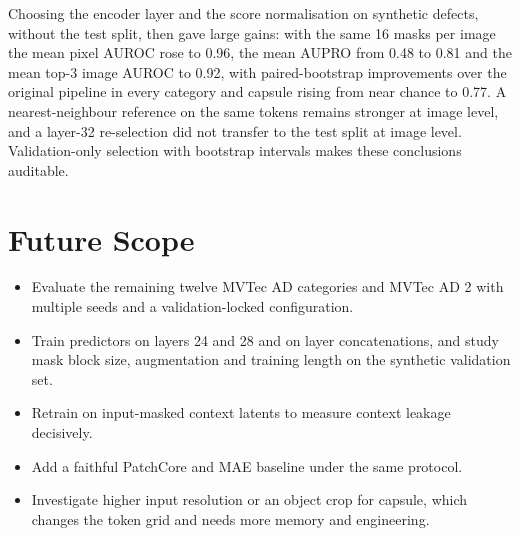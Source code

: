 \documentclass[12pt,a4paper,oneside]{report}
\begin{document}
Choosing the encoder layer and the score normalisation on synthetic defects,
without the test split, then gave large gains: with the same 16 masks per
image the mean pixel AUROC rose to 0.96, the mean AUPRO from 0.48 to 0.81
and the mean top-3 image AUROC to 0.92, with paired-bootstrap improvements
over the original pipeline in every category and capsule rising from near
chance to 0.77. A nearest-neighbour reference on the same tokens remains
stronger at image level, and a layer-32 re-selection did not transfer to the
test split at image level. Validation-only selection with bootstrap
intervals makes these conclusions auditable.

\section{Future Scope}

\begin{itemize}[leftmargin=*]
    \item Evaluate the remaining twelve MVTec AD categories and MVTec AD 2
    with multiple seeds and a validation-locked configuration.
    \item Train predictors on layers 24 and 28 and on layer concatenations,
    and study mask block size, augmentation and training length on the
    synthetic validation set.
    \item Retrain on input-masked context latents to measure context leakage
    decisively.
    \item Add a faithful PatchCore and MAE baseline under the same protocol.
    \item Investigate higher input resolution or an object crop for capsule,
    which changes the token grid and needs more memory and engineering.
\end{itemize}
\end{document}
